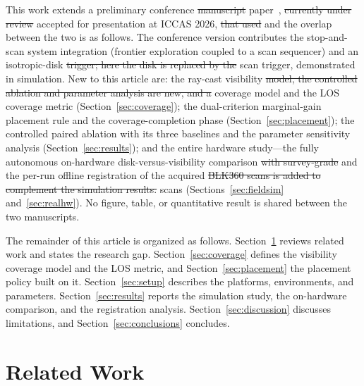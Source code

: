 \documentclass[sensors,article,submit,pdftex,moreauthors]{Definitions/mdpi}
\providecommand{\DIFadd}[1]{{\protect\color{blue} \sf #1}} %
\providecommand{\DIFdel}[1]{{\protect\color{red}\protect\scriptsize\protect\sout{#1}}} %
\providecommand{\DIFaddbegin}{} %
\providecommand{\DIFaddend}{} %
\providecommand{\DIFdelbegin}{} %
\providecommand{\DIFdelend}{} %
\begin{document}
This work extends a preliminary conference \DIFdelbegin \DIFdel{manuscript}\DIFdelend \DIFaddbegin \DIFadd{paper}\DIFaddend ~\cite{iccas2026}, \DIFdelbegin \DIFdel{currently
under review }\DIFdelend \DIFaddbegin \DIFadd{accepted
for presentation }\DIFaddend at ICCAS 2026, \DIFdelbegin \DIFdel{that used }\DIFdelend \DIFaddbegin \DIFadd{and the overlap between the two is as
follows. The conference version contributes the stop-and-scan system
integration (frontier exploration coupled to a scan sequencer) and }\DIFaddend an
isotropic-disk \DIFdelbegin \DIFdel{trigger; here the disk is replaced by the }\DIFdelend \DIFaddbegin \DIFadd{scan trigger, demonstrated in simulation. New to this article
are: the }\DIFaddend ray-cast visibility \DIFdelbegin \DIFdel{model, the controlled ablation and parameter analysis are new, and a }\DIFdelend \DIFaddbegin \DIFadd{coverage model and the LOS coverage metric
(Section~\ref{sec:coverage}); the dual-criterion marginal-gain placement rule
and the coverage-completion phase (Section~\ref{sec:placement}); the
controlled paired ablation with its three baselines and the parameter
sensitivity analysis (Section~\ref{sec:results}); and the entire hardware
study---the }\DIFaddend fully autonomous on-hardware disk-versus-visibility comparison \DIFdelbegin \DIFdel{with survey-grade
}\DIFdelend \DIFaddbegin \DIFadd{and
the per-run }\DIFaddend offline registration of the acquired \DIFdelbegin \DIFdel{BLK360 scans
is added to complement the simulation results. }\DIFdelend \DIFaddbegin \DIFadd{scans
(Sections~\ref{sec:fieldsim} and~\ref{sec:realhw}). No figure, table, or
quantitative result is shared between the two manuscripts.
}\DIFaddend 

\DIFaddbegin \DIFadd{The remainder of this article is organized as follows.
Section~\ref{sec:related} reviews related work and states the research gap.
Section~\ref{sec:coverage} defines the visibility coverage model and the LOS
metric, and Section~\ref{sec:placement} the placement policy built on it.
Section~\ref{sec:setup} describes the platforms, environments, and parameters.
Section~\ref{sec:results} reports the simulation study, the on-hardware
comparison, and the registration analysis. Section~\ref{sec:discussion}
discusses limitations, and Section~\ref{sec:conclusions} concludes.
}

\DIFaddend \section{Related Work}
\DIFaddbegin \label{sec:related}
\DIFaddend 
\end{document}
